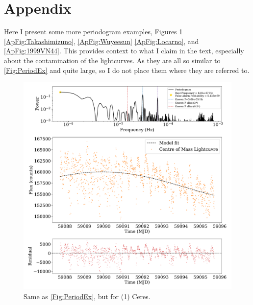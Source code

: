 \documentclass{UCreport}
\begin{document}
\section*{Appendix}
\renewcommand{\thefigure}{A.\arabic{figure}}
\setcounter{figure}{0}

Here I present some more periodogram examples, Figures \ref{ApFig:Ceres} \ref{ApFig:Takashimizuno}, \ref{ApFig:Wuyeesun} \ref{ApFig:Locarno}, and \ref{ApFig:1999VN44}.
This provides context to what I claim in the text, especially about the contamination of the lightcurves.
As they are all so similar to \autoref{Fig:PeriodEx} and quite large, so I do not place them where they are referred to.

\begin{figure}
  \centering
  \includegraphics[width = \textwidth]{Figures/PeriodogramCeresResid.pdf}
  \caption[(1) Ceres Periodogram]{Same as \autoref{Fig:PeriodEx}, but for (1) Ceres.}
  \label{ApFig:Ceres}
\end{figure}
\end{document}
